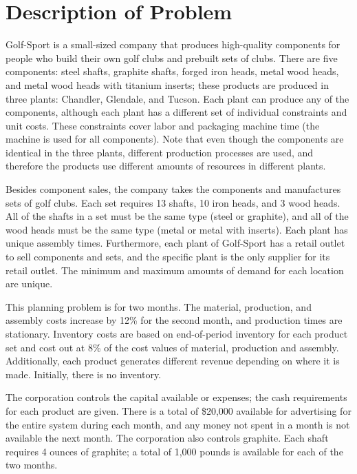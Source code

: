 \documentclass[12pt]{article}
\begin{document}
\section{Description of Problem}
Golf-Sport is a small-sized company that produces high-quality components for people who build their own golf clubs and prebuilt sets of clubs. There are five components:  steel shafts, graphite shafts, forged iron heads, metal wood heads, and metal wood heads with titanium inserts; these products are produced in three plants:  Chandler, Glendale, and Tucson. Each plant can produce any of the components, although each plant has a different set of individual constraints and unit costs. These constraints cover labor and packaging machine time (the machine is used for all components). Note that even though the components are identical in the three plants, different production processes are used, and therefore the products use different amounts of resources in different plants.
\par
Besides component sales, the company takes the components and manufactures sets of golf clubs. Each set requires 13 shafts, 10 iron heads, and 3 wood heads. All of the shafts in a set must be the same type (steel or graphite), and all of the wood heads must be the same type (metal or metal with inserts). Each plant has unique assembly times.  Furthermore, each plant of Golf-Sport has a retail outlet to sell components and sets, and the specific plant is the only supplier for its retail outlet. The minimum and maximum amounts of demand for each location are unique.
\par
This planning problem is for two months. The material, production, and assembly costs increase by 12\% for the second month, and production times are stationary. Inventory costs are based on end-of-period inventory for each product set and cost out at 8\% of the cost values of material, production and assembly. Additionally, each product generates different revenue depending on where it is made. Initially, there is no inventory.
\par
The corporation controls the capital available or expenses; the cash requirements for each product are given. There is a total of \$20,000 available for advertising for the entire system during each month, and any money not spent in a month is not available the next month. The corporation also controls graphite. Each shaft requires 4 ounces of graphite; a total of 1,000 pounds is available for each of the two months. 
\par
\end{document}
